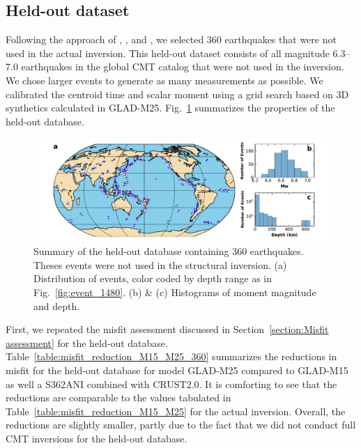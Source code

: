 \documentclass[extra,mreferee]{gji}
\begin{document}
\subsection{Held-out dataset}

Following the approach of \cite{tape2009adjoint}, \cite{chen2015multiparameter}, and \cite{bozdaug2016global},
we selected 360 earthquakes that were not used in the actual inversion.
This held-out dataset consists of all magnitude 6.3--7.0 earthquakes in the global CMT catalog that were not used in the inversion.
We chose larger events to generate as many measurements as possible.
We calibrated the centroid time and scalar moment using a grid search based on 3D synthetics calculated in GLAD-M25.
Fig.~\ref{fig:events_360} summarizes the properties of the held-out database.

\begin{figure}
  \centering
  \includegraphics[width=\textwidth]{figures/events_360.pdf}
  \caption{Summary of the held-out database containing 360 earthquakes. Theses events were not used in the structural inversion. (a) Distribution of events, color coded by depth range as in Fig.~\ref{fig:event_1480}. (b) \& (c) Histograms of moment magnitude and depth.}
  \label{fig:events_360}
\end{figure}

First, we repeated the misfit assessment discussed in Section~\ref{section:Misfit assessment} for the held-out database.
Table~\ref{table:misfit_reduction_M15_M25_360} summarizes the reductions in misfit for the held-out database for model GLAD-M25 compared to GLAD-M15 as well a S362ANI combined with CRUST2.0.
It is comforting to see that the reductions are comparable to the
values tabulated in Table~\ref{table:misfit_reduction_M15_M25} for the actual inversion.
Overall, the reductions are slightly smaller, partly due to the fact that we did not conduct full CMT inversions for the held-out database.
\end{document}
